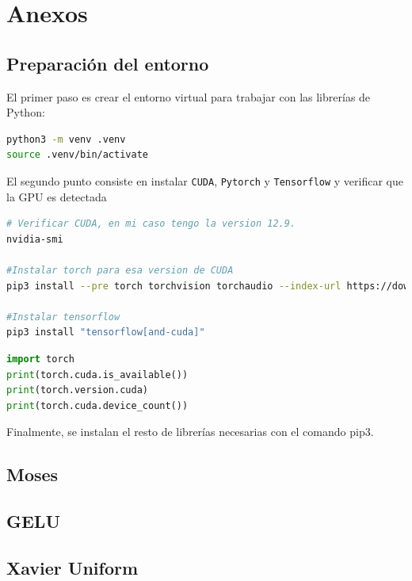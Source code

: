\documentclass[11pt]{book}
\newcommand{\clearemptydoublepage}{\newpage{\pagestyle{empty}\cleardoublepage}}
\begin{document}
\clearemptydoublepage

\printbibliography[title={Referencias Bibliográficas}]

\appendix 
\chapter{Anexos}

\section{Preparación del entorno} \label{sec:entorno}

El primer paso es crear el entorno virtual para trabajar con las librerías de Python:
\begin{lstlisting}[language=bash]
python3 -m venv .venv
source .venv/bin/activate
\end{lstlisting}

El segundo punto consiste en instalar \texttt{CUDA}, \texttt{Pytorch} y \texttt{Tensorflow} y verificar que la GPU es detectada
\begin{lstlisting}[language=bash]
# Verificar CUDA, en mi caso tengo la version 12.9.
nvidia-smi

#Instalar torch para esa version de CUDA
pip3 install --pre torch torchvision torchaudio --index-url https://download.pytorch.org/whl/nightly/cu129

#Instalar tensorflow
pip3 install "tensorflow[and-cuda]"

\end{lstlisting}

\begin{lstlisting}[language=Python]
import torch
print(torch.cuda.is_available())
print(torch.version.cuda)
print(torch.cuda.device_count())
\end{lstlisting}

Finalmente, se instalan el resto de librerías necesarias con el comando pip3.

\section{Moses} \label{sec:moses}
\section{GELU} \label{sec:gelu}
\section{Xavier Uniform} \label{sec:xavier}
\end{document}
